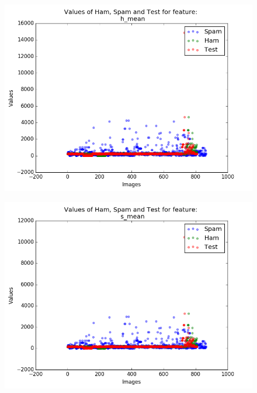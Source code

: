 \begin{figure}[h]
	\centering
	\begin{minipage}{.5\textwidth}
		\centering
		\includegraphics[width=\linewidth]{images/appA/h_mean_values_scatter}
		\label{fig:h_mean_values_scatter}
	\end{minipage}%
	\begin{minipage}{.5\textwidth}
		\centering
		\includegraphics[width=\linewidth]{images/appA/s_mean_values_scatter}
		\label{fig:s_mean_values_scatter}
	\end{minipage}
\end{figure}


